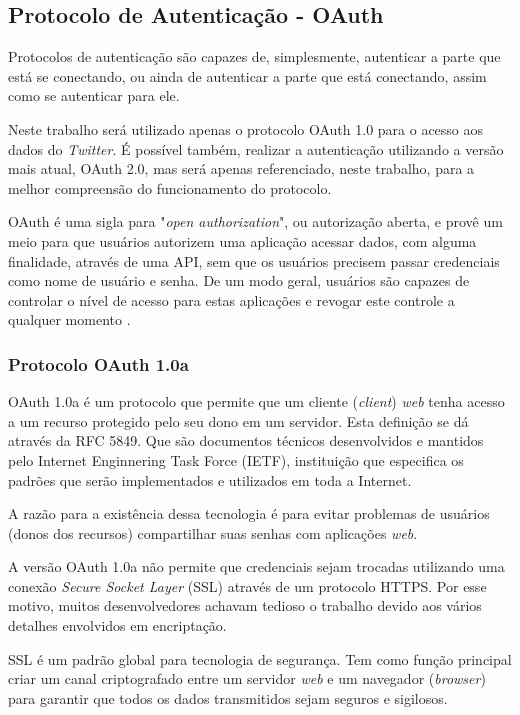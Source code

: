 \subsection{Protocolo de Autenticação - OAuth}
Protocolos de autenticação são capazes de, simplesmente, autenticar a parte que está se conectando, ou ainda de autenticar a parte que está conectando, assim como se autenticar para ele.

Neste trabalho será utilizado apenas o protocolo OAuth 1.0 para o acesso aos dados do \textit{Twitter}. É possível também, realizar a autenticação utilizando a versão mais atual, OAuth 2.0, mas será apenas referenciado, neste trabalho, para a melhor compreensão do funcionamento do protocolo.

OAuth é uma sigla para "\textit{open authorization}", ou autorização aberta, e provê um meio para que usuários autorizem uma aplicação acessar dados, com alguma finalidade, através de uma API, sem que os usuários precisem passar credenciais como nome de usuário e senha. De um modo geral, usuários são capazes de controlar o nível de acesso para estas aplicações e revogar este controle a qualquer momento \cite{mining-social-web}.

\subsubsection{Protocolo OAuth 1.0a}
OAuth 1.0a é um protocolo que permite que um cliente (\textit{client}) \textit{web} tenha acesso a um recurso protegido pelo seu dono em um servidor. Esta definição se dá através da RFC 5849. Que são documentos técnicos desenvolvidos e mantidos pelo Internet Enginnering Task Force (IETF), instituição que especifica os padrões que serão implementados e utilizados em toda a Internet.

A razão para a existência dessa tecnologia é para evitar problemas de usuários (donos dos recursos) compartilhar suas senhas com aplicações \textit{web}.

A versão OAuth 1.0a não permite que credenciais sejam trocadas utilizando uma conexão \textit{Secure Socket Layer} (SSL) através de um protocolo HTTPS. Por esse motivo, muitos desenvolvedores achavam tedioso o trabalho devido aos vários detalhes envolvidos em encriptação.

SSL é um padrão global para tecnologia de segurança. Tem como função principal criar um canal criptografado entre um servidor \textit{web} e um navegador (\textit{browser}) para garantir que todos os dados transmitidos sejam seguros e sigilosos.

